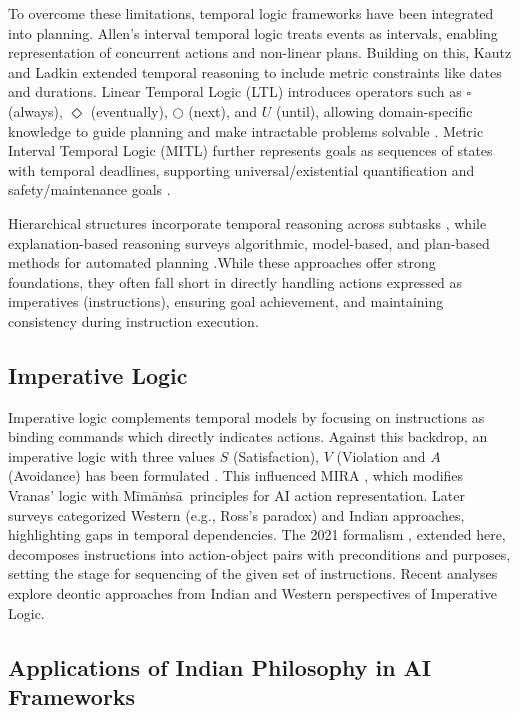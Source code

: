 \documentclass[a4paper,11pt]{lmcs}
\newcommand{\mimamsa}{M\={i}m\={a}\.ms\={a}}
\begin{document}
To overcome these limitations, temporal logic frameworks have been integrated into planning. Allen's interval temporal logic \citep{allen1983maintaining} treats events as intervals, enabling representation of concurrent actions and non-linear plans. Building on this, Kautz and Ladkin \citep{kautz1991integrating} extended temporal reasoning to include metric constraints like dates and durations. Linear Temporal Logic (LTL) \citep{huth2004logic} introduces operators such as $\square$ (always), $\Diamond$ (eventually), $\bigcirc$ (next), and $U$ (until), allowing domain-specific knowledge to guide planning and make intractable problems solvable \citep{bacchus1996planning}. Metric Interval Temporal Logic (MITL) further represents goals as sequences of states with temporal deadlines, supporting universal/existential quantification and safety/maintenance goals \citep{bacchus2000using}.

Hierarchical structures incorporate temporal reasoning across subtasks \citep{fei2025hierarchical}, while explanation-based reasoning surveys algorithmic, model-based, and plan-based methods for automated planning \citep{eriksson2019explanation}.While these approaches offer strong foundations, they often fall short in directly handling actions expressed as imperatives (instructions), ensuring goal achievement, and maintaining consistency during instruction execution.

\subsection{Imperative Logic}
Imperative logic complements temporal models by focusing on instructions as binding commands which directly indicates actions. Against this backdrop, an imperative logic with three values $S$ (Satisfaction), $V$ (Violation and $A$ (Avoidance) has been formulated \citep{vranas2008}. This influenced MIRA \citep{srinivasan2012mira}, which modifies Vranas' logic with \mimamsa~principles for AI action representation. Later surveys \cite{srinivasan2017survey} categorized Western (e.g., Ross's paradox) and Indian approaches, highlighting gaps in temporal dependencies. The 2021 formalism \citep{srinivasan2021formalism}, extended here, decomposes instructions into action-object pairs with preconditions and purposes, setting the stage for sequencing of the given set of instructions. Recent analyses \citep{sanyal} explore deontic approaches from Indian and Western perspectives of Imperative Logic.

\subsection{Applications of Indian Philosophy in AI Frameworks}
\end{document}
